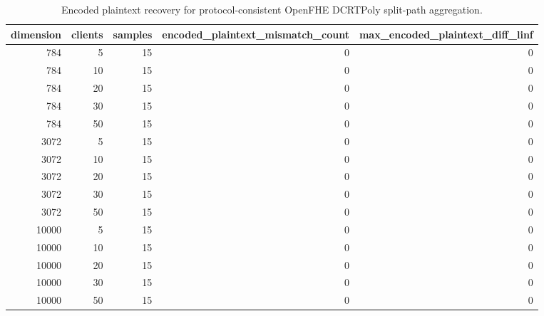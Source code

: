 \begin{table}
\caption{Encoded plaintext recovery for protocol-consistent OpenFHE DCRTPoly split-path aggregation.}
\label{tab:eval-correctness}
\begin{tabular}{rrrrr}
\toprule
dimension & clients & samples & encoded_plaintext_mismatch_count & max_encoded_plaintext_diff_linf \\
\midrule
784 & 5 & 15 & 0 & 0 \\
784 & 10 & 15 & 0 & 0 \\
784 & 20 & 15 & 0 & 0 \\
784 & 30 & 15 & 0 & 0 \\
784 & 50 & 15 & 0 & 0 \\
3072 & 5 & 15 & 0 & 0 \\
3072 & 10 & 15 & 0 & 0 \\
3072 & 20 & 15 & 0 & 0 \\
3072 & 30 & 15 & 0 & 0 \\
3072 & 50 & 15 & 0 & 0 \\
10000 & 5 & 15 & 0 & 0 \\
10000 & 10 & 15 & 0 & 0 \\
10000 & 20 & 15 & 0 & 0 \\
10000 & 30 & 15 & 0 & 0 \\
10000 & 50 & 15 & 0 & 0 \\
\bottomrule
\end{tabular}
\end{table}

